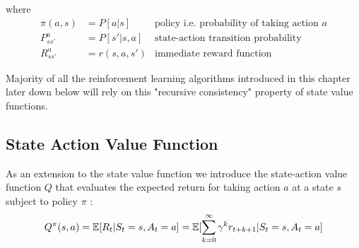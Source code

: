 where 
\begin{align*}
    \pi(a, s) &= P[a|s] &\text{policy i.e. probability of taking action $a$}\\
    P^{a}_{ss'} &= P[s' | s, a] &\text{state-action transition probability}\\
    R^{a}_{ss'} &= r(s, a, s') &\text{immediate reward function}
\end{align*}




Majority of all the reinforcement learning algorithms introduced in this chapter later down below will rely on this "recursive consistency" \cite{lecture_mdp} property of state value functions. 


\subsection{State Action Value Function}
As an extension to the state value function we introduce the state-action value function $Q$ that evaluates the expected return for taking action $a$ at a state $s$ subject to policy $\pi$ \cite{lecture_mdp} :
\begin{align}
    Q^{\pi}(s, a) = \operatorname{\mathbb{E}}[R_t | S_t = s, A_t = a] = \operatorname{\mathbb{E}}[\sum^{\infty}_{k=0} \gamma^k r_{t+k+1} | S_t = s, A_t = a]
\end{align}

